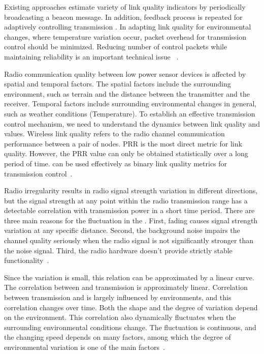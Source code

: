 \documentclass[12pt, conference, compsocconf, onecolumn, draftcls]{IEEEtran}
\begin{document}
Existing approaches estimate variety of link quality indicators by periodically broadcasting a beacon message. In addition, feedback process is repeated for adaptively controlling transmission . In adapting link quality for environmental changes, where temperature variation occur, packet overhead for transmission  control should be minimized. Reducing number of control packets while maintaining reliability is an important technical issue ~\cite{8}.

Radio communication quality between low power sensor devices is affected by spatial and temporal factors. The spatial factors include the surrounding environment, such as terrain and the distance between the transmitter and the receiver. Temporal factors include surrounding environmental changes in general, such as weather conditions (Temperature). To establish an effective transmission  control mechanism, we need to understand the dynamics between link quality and  values. Wireless link quality refers to the radio channel communication performance between a pair of nodes. PRR is the most direct metric for link quality. However, the PRR value can only be obtained statistically over a long period of time.  can be used effectively as binary link quality metrics for transmission  control~\cite{9}.

Radio irregularity results in radio signal strength variation in different directions, but the signal strength at any point within the radio transmission range has a detectable correlation with transmission power in a short time period.  There are three main reasons for the fluctuation in the . First, fading causes signal strength variation at any specific distance. Second, the background noise impairs the channel quality seriously when the radio signal is not significantly stronger than the noise signal. Third, the radio hardware doesn’t provide strictly stable functionality~\cite{10}.

Since the variation is small, this relation can be approximated by a linear curve. The correlation between  and transmission  is approximately linear.  Correlation between transmission  and  is largely influenced by environments, and this correlation changes over time. Both the shape and the degree of variation depend on the environment. This correlation also dynamically fluctuates when the surrounding environmental conditions change. The fluctuation is continuous, and the changing speed depends on many factors, among which the degree of environmental variation is one of the main factors~\cite{11}.
\end{document}
